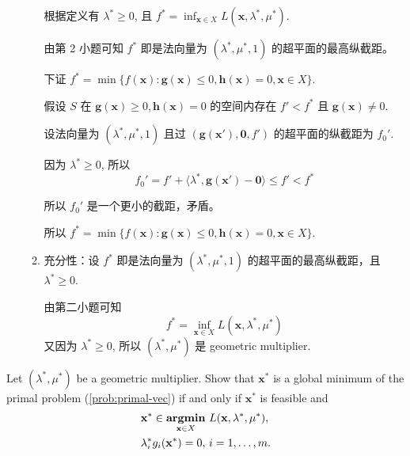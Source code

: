 \documentclass[11pt,letter,notitlepage]{article}
\DeclareMathOperator*{\argmin}{\bf argmin}
\begin{document}
\begin{solution}
\begin{enumerate}
\begin{enumerate}
			            根据定义有 $\lambda^*\geq0$, 且 $f^*=\inf_{\mathbf{x}\in X} L(\mathbf{x},\lambda^*,\mu^*)$.

			            由第 2 小题可知 $f^*$ 即是法向量为 $(\lambda^*,\mu^*,1)$ 的超平面的最高纵截距。

			            下证 $f^*=\min\{f(\mathbf{x}):\mathbf{g}(\mathbf{x})\leq0,\mathbf{h}(\mathbf{x})=0,\mathbf{x}\in X\}$.

			            假设 $S$ 在 $\mathbf{g}(\mathbf{x})\geq0,\mathbf{h}(\mathbf{x})=0$ 的空间内存在 $f'<f^*$ 且 $\mathbf{g}(\mathbf{x})\neq 0$.

			            设法向量为 $(\lambda^*,\mu^*,1)$ 且过 $(\mathbf{g}(\mathbf{x}'),\mathbf{0},f')$ 的超平面的纵截距为 $f_0'$.

			            因为 $\lambda^*\geq0$, 所以
			            $$f_0'=f'+\langle \lambda^*,\mathbf{g}(\mathbf{x}')-\mathbf{0} \rangle \leq f'<f^*$$

			            所以 $f_0'$ 是一个更小的截距，矛盾。

			            所以 $f^*=\min\{f(\mathbf{x}):\mathbf{g}(\mathbf{x})\leq0,\mathbf{h}(\mathbf{x})=0,\mathbf{x}\in X\}$.

			      \item 充分性：设 $f^*$ 即是法向量为 $(\lambda^*,\mu^*,1)$ 的超平面的最高纵截距，且 $\lambda^*\geq0$.

			            由第二小题可知
			            $$f^*=\inf_{\mathbf{x}\in X} L(\mathbf{x},\lambda^*,\mu^*)$$
			            又因为 $\lambda^*\geq0$, 所以 $(\lambda^*,\mu^*)$ 是 geometric multiplier.
		      \end{enumerate}

	\end{enumerate}
\end{solution}


\newpage
\begin{exercise}
	Let $(\lambda^*,\mu^*)$ be a geometric multiplier. Show that $\mathbf{x}^*$ is a global minimum of the primal problem (\ref{prob:primal-vec}) if and only if $\mathbf{x}^*$ is feasible and
	\begin{align*}
		 & \mathbf{x}^*\in\argmin_{\mathbf{x}\in X}\,L(\mathbf{x},\lambda^*,\mu^*), \\
		 & \lambda_i^*g_i(\mathbf{x}^*)=0,\,i=1,\ldots,m.
	\end{align*}
\end{exercise}
\end{document}
